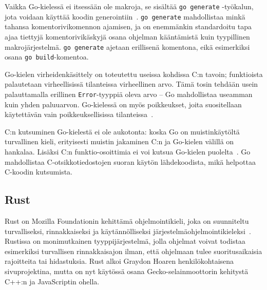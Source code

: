 Vaikka Go-kielessä ei itsessään ole makroja, se sisältää \texttt{go~generate}
-työkalun, jota voidaan käyttää koodin generointiin~\citep{gogenerate}.
\texttt{go~generate} mahdollistaa minkä tahansa komentorivikomennon ajamisen,
ja on enemmänkin standardoitu tapa ajaa tiettyjä komentorivikäskyjä osana
ohjelman kääntämistä kuin tyypillinen makrojärjestelmä.
\texttt{\mbox{go~generate}} ajetaan erillisenä komentona,
eikä esimerkiksi osana \texttt{\mbox{go~build}}-komentoa.



Go-kielen virheidenkäsittely on toteutettu useissa kohdissa C:n tavoin;
funktioista palautetaan virheellisissä tilanteissa virheellinen arvo. Tämä
tosin tehdään usein palauttamalla erillinen \texttt{Error}-tyyppiä oleva arvo
-- Go mahdollistaa useamman kuin yhden paluuarvon. Go-kielessä on myös
poikkeukset, joita suositellaan käytettävän vain poikkeuksellisissa
tilanteissa~\citep{effectivego}.

C:n kutsuminen Go-kielestä ei ole aukotonta: koska Go on muistinkäytöltä
turvallinen kieli, erityisesti muistin jakaminen C:n ja Go-kielen välillä on
hankalaa. Lisäksi C:n funktio-osoittimia ei voi kutsua Go-kielen
puolelta~\citep{cgo}. Go mahdollistaa C-otsikkotiedostojen suoran käytön
lähdekoodista, mikä helpottaa C-koodin kutsumista.

\subsection{Rust}

Rust on Mozilla Foundationin kehittämä ohjelmointikieli, joka on suunniteltu
turvalliseksi, rinnakkaiseksi ja käytännölliseksi
järjestelmäohjelmointikieleksi~\citep{rustfaq}. Rustissa on monimutkainen
tyyppijärjestelmä, jolla ohjelmat voivat todistaa esimerkiksi turvallisen
rinnakkaisajon ilman, että ohjelmaan tulee suoritusaikaisia rajoitteita tai
hidastuksia. Rust alkoi Graydon Hoaren henkilökohtaisena sivuprojektina, mutta
on nyt käytössä osana Gecko-selainmoottorin kehitystä C++:n ja JavaScriptin
ohella.

